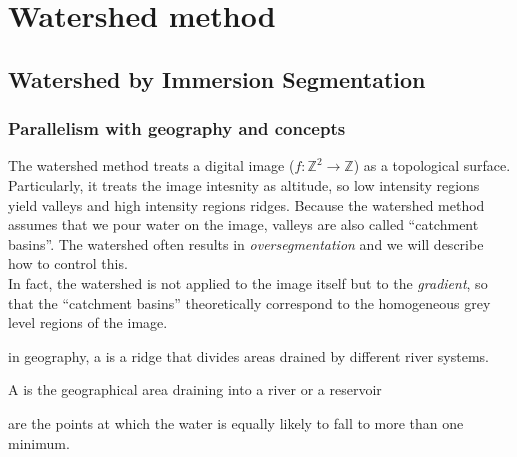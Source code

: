 \documentclass[a4paper]{article}
\begin{document}
\section{Watershed method}


\subsection{Watershed by Immersion Segmentation}

\subsubsection{Parallelism with geography and concepts}

The watershed method treats a digital image ($f: \mathbb{Z}^2 \rightarrow \mathbb{Z}$) as a topological surface. Particularly, it treats the image intesnity as altitude, so low intensity regions yield valleys and high intensity regions ridges. Because the watershed method assumes that we pour water on the image, valleys are also called ``catchment basins''. The watershed often results in \textit{oversegmentation} and we will describe how to control this.\\
In fact, the watershed is not applied to the image itself but to the \textit{gradient}, so that the ``catchment basins'' theoretically correspond to the homogeneous grey level regions of the image.
\begin{definition}
in geography, a  is a ridge that divides areas drained by different river systems. 
\end{definition}
\begin{definition}
A  is the geographical area draining into a river or a reservoir
\end{definition}
\begin{definition}
 are the points at which the water is equally likely to fall to more than one minimum.
\end{definition}
\end{document}
